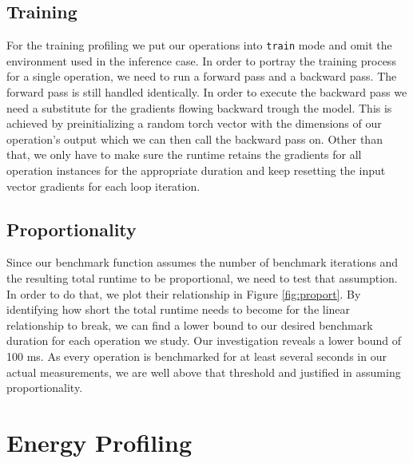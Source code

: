 \subsection{Training}
For the training profiling we put our operations into \texttt{train} mode and omit the environment used in the inference case. In order to portray the training process for a single operation, we need to run a forward pass and a backward pass. The forward pass is still handled identically. In order to execute the backward pass we need a substitute for the gradients flowing backward trough the model. This is achieved by preinitializing a random torch vector with the dimensions of our operation's output which we can then call the backward pass on. Other than that, we only have to make sure the runtime retains the gradients for all operation instances for the appropriate duration and keep resetting the input vector gradients for each loop iteration.

\subsection{Proportionality}
Since our benchmark function assumes the number of benchmark iterations and the resulting total runtime to be proportional, we need to test that assumption. In order to do that, we plot their relationship in Figure \ref{fig:proport}. By identifying how short the total runtime needs to become for the linear relationship to break, we can find a lower bound to our desired benchmark duration for each operation we study. Our investigation reveals a lower bound of 100 ms. As every operation is benchmarked for at least several seconds in our actual measurements, we are well above that threshold and justified in assuming proportionality.


\section{Energy Profiling}




